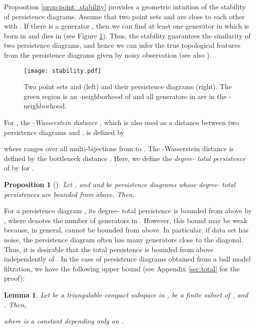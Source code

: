 \documentclass{article}
\newtheorem{lem}[thm]{Lemma}
\newtheorem{prop}[thm]{Proposition}
\begin{document}
Proposition \ref{prop:point_stability} provides a geometric intuition of the stability of persistence diagrams.
Assume that two point sets  and  are close to each other with . If there is a generator , then we can find at least one generator in  which is born in  and dies in  (see Figure \ref{fig:stability}).
Thus, the stability guarantees the similarity of two persistence diagrams, and hence we can infer the true topological features from the persistence diagrams given by noisy observation (see also \cite{FLRWBS14}).
\begin{figure}[htbp]
\begin{center}
\texttt{[image: stability.pdf]}
\vspace{-3mm}
\caption{Two point sets  and  (left) and their persistence diagrams (right).
The green region is an -neighborhood of  and all generators in  are in the -neighborhood.}
\label{fig:stability}
\end{center}
\end{figure}

For , the {\em -Wasserstein distance} , which is also used as a distance between two persistence diagrams  and , is defined by

where  ranges over all multi-bijections from  to .
The -Wasserstein distance  is defined by the bottleneck distance . Here, we define the {\em degree- total persistence} of  by  for .

\begin{prop}[\cite{CEHM10}]
\label{prop:wasserstein_stability}
Let , and  and  be persistence diagrams whose degree- total persistences are bounded from above.
Then, 

\end{prop}

For a persistence diagram , its degree- total persistence is bounded from above by , where  denotes the number of generators in .
However, this bound may be weak because, in general,  cannot be bounded from above.
In particular, if data set has noise, the persistence diagram often has many generators close to the diagonal.
Thus, it is desirable that the total persistence is bounded from above independently of .
In the case of persistence diagrams obtained from a ball model filtration, we have the following upper bound (see Appendix \ref{sec:total} for the proof):
\begin{lem}
\label{lem:point_total}
Let  be a triangulable compact subspace in ,  be a finite subset of , and . 
Then, 

where  is a constant depending only on .
\end{lem}
\end{document}

